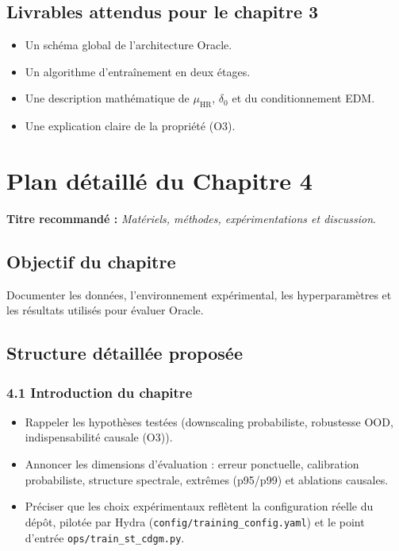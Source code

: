 \documentclass[12pt,a4paper]{article}
\begin{document}
\subsection*{Livrables attendus pour le chapitre 3}
\begin{itemize}
    \item Un sch\'ema global de l'architecture Oracle.
    \item Un algorithme d'entra\^inement en deux \'etages.
    \item Une description math\'ematique de $\mu_{\mathrm{HR}}$, $\delta_0$ et du conditionnement EDM.
    \item Une explication claire de la propri\'et\'e (O3).
\end{itemize}

\section{Plan d\'etaill\'e du Chapitre 4}
\textbf{Titre recommand\'e :} \emph{Mat\'eriels, m\'ethodes, exp\'erimentations et discussion}.

\subsection*{Objectif du chapitre}
Documenter les donn\'ees, l'environnement exp\'erimental, les hyperparam\`etres et les r\'esultats utilis\'es pour \'evaluer Oracle.

\subsection*{Structure d\'etaill\'ee propos\'ee}

\subsubsection*{4.1 Introduction du chapitre}
\begin{itemize}
    \item Rappeler les hypoth\`eses test\'ees (downscaling probabiliste, robustesse OOD, indispensabilit\'e causale (O3)).
    \item Annoncer les dimensions d'\'evaluation : erreur ponctuelle, calibration probabiliste, structure spectrale, extr\^emes (p95/p99) et ablations causales.
    \item Pr\'eciser que les choix exp\'erimentaux refl\`etent la configuration r\'eelle du d\'ep\^ot, pilot\'ee par Hydra (\texttt{config/training\_config.yaml}) et le point d'entr\'ee \texttt{ops/train\_st\_cdgm.py}.
\end{itemize}
\end{document}
